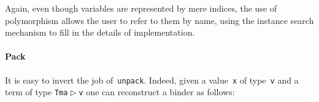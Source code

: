 \documentclass[9pt,preprint,authoryear]{sigplanconf}
\begin{document}
%
Again, even though variables are represented by mere indices, the use
    of polymorphism allows the user to refer to them by name, using the instance
    search mechanism to fill in the details of implementation.%


\paragraph*{Pack}

%
It is easy to invert the job
    of{~}\textcolor[rgb]{0,0,0.80}{\texttt{unpack}}. Indeed, given a value{~}\textcolor[rgb]{0,0,0.80}{\texttt{x}} of type{~}\textcolor[rgb]{0,0,0.80}{\texttt{v}} and a term
    of type \textcolor[rgb]{0,0,0.80}{\texttt{Tm}}\textcolor[rgb]{0,0,0.80}{\texttt{\mbox{\hspace{0.50em}}}}\textcolor[cmyk]{0,0.65,0.99,0}{\texttt{\makebox[1.22ex][l]{$ {(} $}}}\textcolor[rgb]{0,0,0.80}{\texttt{a}}\textcolor[rgb]{0,0,0.80}{\texttt{\mbox{\hspace{0.50em}}}}\textcolor[rgb]{0,0,0.80}{\texttt{$ \vartriangleright $}}\textcolor[rgb]{0,0,0.80}{\texttt{\mbox{\hspace{0.50em}}}}\textcolor[rgb]{0,0,0.80}{\texttt{v}}\textcolor[cmyk]{0,0.65,0.99,0}{\texttt{\makebox[1.22ex][r]{$ {)} $}}} one can reconstruct a binder as follows{:} %


{\nopagebreak }
\end{document}
